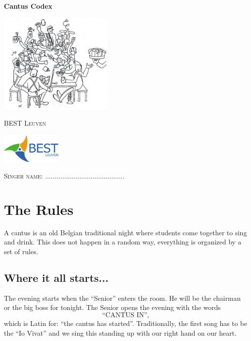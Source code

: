 \documentclass[a5paper]{article}
\begin{document}
\setcounter{secnumdepth}{1}
\setcounter{tocdepth}{3}


	\begin{titlepage}
		\centering
		{\huge\bfseries Cantus Codex\par}
		\vspace{0.5cm}
        \includegraphics[height=5cm]{frontpicture.png}
        \vspace{0.5cm}
        \vfill
		{\scshape\LARGE BEST Leuven\par}
		\vspace{0.5cm}
		\includegraphics[height=1.5cm]{bestleuvenlogo.png}
		\vfill
		\vspace{0.5cm}
		{\scshape\LARGE Singer name: ..........................................\par}
	\end{titlepage}

	\tableofcontents

	\newpage



\section{The Rules}
\label{sec:rules}

A cantus is an old Belgian traditional night where students come together to sing and drink. This does not happen in a random way, everything is organized by a set of rules.

\subsection{Where it all starts...}
\label{sub:start}

The evening starts when the ``Senior'' enters the room. He will be the chairman or the big boss for tonight. The Senior opens the evening with the words $$\text{``CANTUS IN''},$$ which is Latin for: ``the cantus has started''. Traditionally, the first song has to be the ``Io Vivat'' and we sing this standing up with our right hand on our heart.
\end{document}

